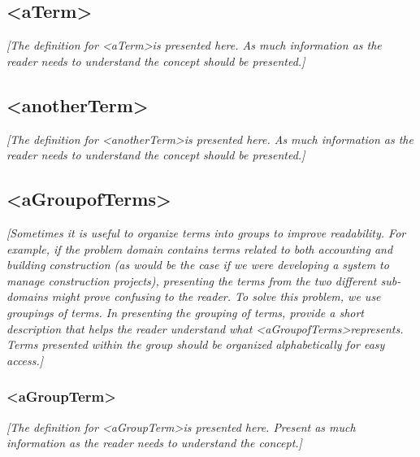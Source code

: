 \documentclass[12pt, a4paper, titlepage]{article}
\begin{document}
\subsection{\textless aTerm\textgreater}  

\textit{{\color{blue}[The definition for \textless aTerm\textgreater is presented here. As much information as the reader needs to understand the concept should be presented.]}}

\subsection{\textless anotherTerm\textgreater}   

\textit{{\color{blue}[The definition for \textless anotherTerm\textgreater is presented here. As much information as the reader needs to understand the concept should be presented.]}}

\subsection{\textless aGroupofTerms\textgreater} 

\textit{{\color{blue}[Sometimes it is useful to organize terms into groups to improve readability. For example, if the problem domain contains terms related to both accounting and building construction (as would be the case if we were developing a system to manage construction projects), presenting the terms from the two different sub-domains might prove confusing to the reader. To solve this problem, we use groupings of terms. In presenting the grouping of terms, provide a short description that helps the reader understand what \textless aGroupofTerms\textgreater represents. Terms presented within the group should be organized alphabetically for easy access.]}}

\subsubsection{\textless aGroupTerm\textgreater}  

\textit{{\color{blue}[The definition for \textless aGroupTerm\textgreater is presented here. Present as much information as the reader needs to understand the concept.]}}
\end{document}
